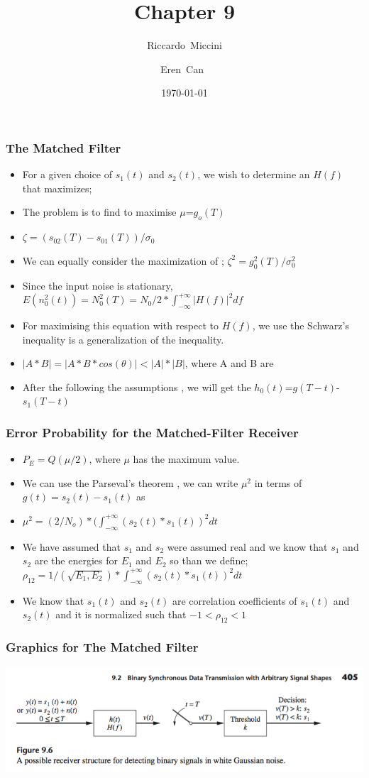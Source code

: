 \documentclass{beamer}
\title{Chapter 9}
\subtitle{}
\author[Riccardo \and Eren]{Riccardo~Miccini\inst{1} \and Eren~Can~\inst{1}}
\institute[DTU]
{
	\inst{1}
	Technical University of Denmark\\
	Digital Communication
}
\date{\today}
\begin{document}
	\frame{\titlepage}
	\begin{frame}
		\frametitle{The Matched Filter}
		\begin{itemize}
			\item For a given choice of $s_1(t)$ and $s_2(t)$, we wish to determine an $H(f)$ that maximizes;
			\item The problem is to find to maximise $\mu$=$g_o(T)$
			\item $\zeta=(s_{02}(T)-s_{01}(T))/\sigma_0$
			\item We can equally consider the maximization of ; $\zeta^2=g^2_0(T)/\sigma^2_0$
			\item Since the input noise is stationary, $E(n^2_0(t)) = N_0^2(T) =N_0/2 * \int_{-\infty}^{+\infty} |H(f)|^2 df $
			\item For maximising this equation with respect to $H(f)$, we use the Schwarz's inequality is a generalization of the inequality.
			\item $|A*B|=|A*B*cos(\theta)| < |A|*|B| $, where A and B are
			\item After the following the assumptions , we will get the $h_0(t)$=$g(T-t)$-$s_1(T-t)$
		\end{itemize}
	\end{frame}

	\begin{frame}
		\frametitle{Error Probability for the Matched-Filter Receiver}
		\begin{itemize}
			\item $ P_E = Q(\mu/2) $, where $ \mu $ has the maximum value.
			\item We can use the Parseval's theorem , we can write $\mu^2$ in terms of $g(t)=s_2(t)-s_1(t)$ as
			\item $\mu^2=(2/N_o)*(\int_{-\infty}^{+\infty } (s_2(t)*s_1(t))^2 dt $
			\item We have assumed that $s_1$ and $s_2$ were assumed real and we know that $s_1$ and $s_2$ are the energies for $E_1$ and $E_2$ so than we  define; $\rho_{12}= 1/(\sqrt{E_1, E_2}) * \int_{-\infty}^{+\infty} (s_2(t)*s_1(t))^2 dt$
			\item We know that $s_1(t)$ and $s_2(t)$ are correlation coefficients of $s_1(t)$ and $s_2(t)$ and it is normalized such that $-1 < \rho_12 < 1$
		\end{itemize}
	\end{frame}



	\begin{frame}
		\frametitle{Graphics for The Matched Filter}
		\includegraphics{Matched Filter.png}
	\end{frame}
\end{document}
